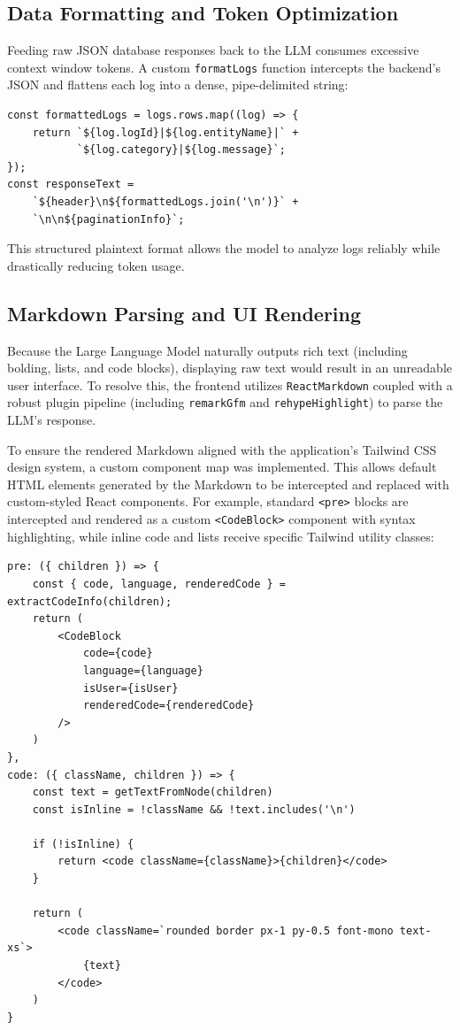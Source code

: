 \subsection{Data Formatting and Token Optimization}
Feeding raw JSON database responses back to the LLM consumes excessive context window tokens. A custom \texttt{formatLogs} function intercepts the backend's JSON and flattens each log into a dense, pipe-delimited string:

\begin{verbatim}
const formattedLogs = logs.rows.map((log) => {
    return `${log.logId}|${log.entityName}|` +
           `${log.category}|${log.message}`;
});
const responseText =
    `${header}\n${formattedLogs.join('\n')}` +
    `\n\n${paginationInfo}`;
\end{verbatim}
This structured plaintext format allows the model to analyze logs reliably while drastically reducing token usage.

\subsection{Markdown Parsing and UI Rendering}
Because the Large Language Model naturally outputs rich text (including bolding, lists, and code blocks), displaying raw text would result in an unreadable user interface. To resolve this, the frontend utilizes \texttt{ReactMarkdown} coupled with a robust plugin pipeline (including \texttt{remarkGfm} and \texttt{rehypeHighlight}) to parse the LLM's response.

To ensure the rendered Markdown aligned with the application's Tailwind CSS design system, a custom component map was implemented. This allows default HTML elements generated by the Markdown to be intercepted and replaced with custom-styled React components. For example, standard \texttt{<pre>} blocks are intercepted and rendered as a custom \texttt{<CodeBlock>} component with syntax highlighting, while inline code and lists receive specific Tailwind utility classes:

\begin{verbatim}
pre: ({ children }) => {
    const { code, language, renderedCode } = extractCodeInfo(children);
    return (
        <CodeBlock
            code={code}
            language={language}
            isUser={isUser}
            renderedCode={renderedCode}
        />
    )
},
code: ({ className, children }) => {
    const text = getTextFromNode(children)
    const isInline = !className && !text.includes('\n')

    if (!isInline) {
        return <code className={className}>{children}</code>
    }

    return (
        <code className=`rounded border px-1 py-0.5 font-mono text-xs`>
            {text}
        </code>
    )
}
\end{verbatim}

